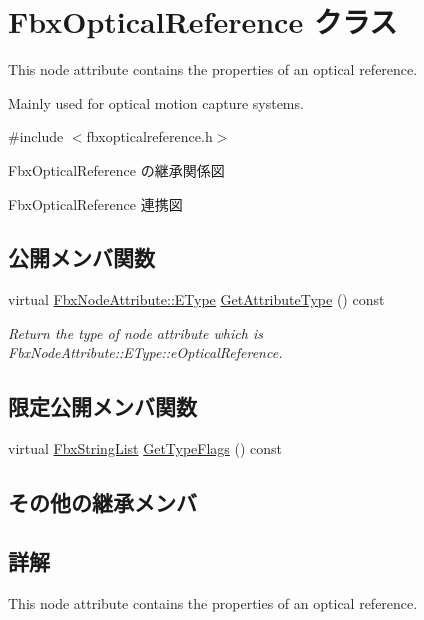 \hypertarget{class_fbx_optical_reference}{}\section{Fbx\+Optical\+Reference クラス}
\label{class_fbx_optical_reference}


This node attribute contains the properties of an optical reference.

Mainly used for optical motion capture systems.  




{\ttfamily \#include $<$fbxopticalreference.\+h$>$}



Fbx\+Optical\+Reference の継承関係図


Fbx\+Optical\+Reference 連携図
\subsection*{公開メンバ関数}
\begin{DoxyCompactItemize}
\item 
virtual \hyperlink{class_fbx_node_attribute_a08e1669d3d1a696910756ab17de56d6a}{Fbx\+Node\+Attribute\+::\+E\+Type} \hyperlink{class_fbx_optical_reference_ac2c1840cbfffb236bd3b9fe49d797e12}{Get\+Attribute\+Type} () const
\begin{DoxyCompactList}\small\item\em Return the type of node attribute which is Fbx\+Node\+Attribute\+::\+E\+Type\+::e\+Optical\+Reference. \end{DoxyCompactList}\end{DoxyCompactItemize}
\subsection*{限定公開メンバ関数}
\begin{DoxyCompactItemize}
\item 
virtual \hyperlink{class_fbx_string_list}{Fbx\+String\+List} \hyperlink{class_fbx_optical_reference_ad45da7e49810bea40ff29fdaf0ca9b0b}{Get\+Type\+Flags} () const
\end{DoxyCompactItemize}
\subsection*{その他の継承メンバ}


\subsection{詳解}
This node attribute contains the properties of an optical reference.

